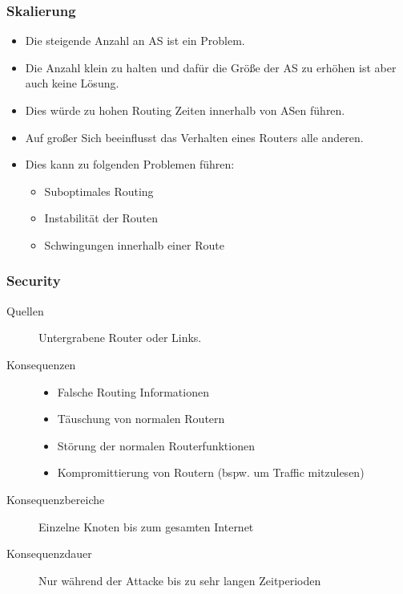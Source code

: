 \documentclass[a4paper, 11pt, accentcolor = tud3b]{tudreport}
\begin{document}
                \subsubsection{Skalierung}
                    \begin{itemize}
                    	\item Die steigende Anzahl an AS ist ein Problem.
                    	\item Die Anzahl klein zu halten und dafür die Größe der AS zu erhöhen ist aber auch keine Lösung.
                    	\item Dies würde zu hohen Routing Zeiten innerhalb von ASen führen.
                    	\item Auf großer Sich beeinflusst das Verhalten eines Routers alle anderen.
                    	\item Dies kann zu folgenden Problemen führen:
	                    	\begin{itemize}
	                    		\item Suboptimales Routing
	                    		\item Instabilität der Routen
	                    		\item Schwingungen innerhalb einer Route
	                    	\end{itemize}
                    \end{itemize}

                \subsubsection{Security} %
                    \begin{description}
                    	\item[Quellen] Untergrabene Router oder Links.
                    	\item[Konsequenzen]
	                    	\begin{itemize}
	                    		\item Falsche Routing Informationen
	                    		\item Täuschung von normalen Routern
	                    		\item Störung der normalen Routerfunktionen
	                    		\item Kompromittierung von Routern (bspw. um Traffic mitzulesen)
	                    	\end{itemize}
	                    \item[Konsequenzbereiche] Einzelne Knoten bis zum gesamten Internet
	                    \item[Konsequenzdauer] Nur während der Attacke bis zu sehr langen Zeitperioden
                    \end{description}
                    
\end{document}
